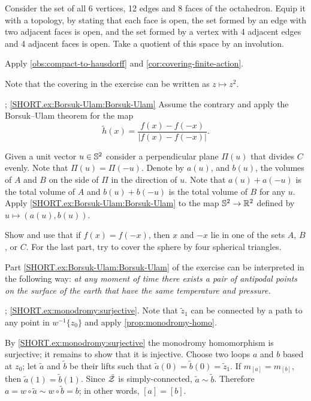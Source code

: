 Consider the set of all 6 vertices, 12 edges and 8 faces of the octahedron.
Equip it with a topology, by stating that each face is open, the set formed by an edge with two adjacent faces is open, and the set formed by a vertex with 4 adjacent edges and 4 adjacent faces is open.
Take a quotient of this space by an involution.


Apply \ref{obs:compact-to-hausdorff} and \ref{cor:covering-finite-action}.

Note that the covering in the exercise can be written as $z\mapsto z^2$.

\parbf{\ref{ex:Borsuk-Ulam}}; \ref{SHORT.ex:Borsuk-Ulam:Borsuk-Ulam}
Assume the contrary and apply the Borsuk--Ulam theorem for the map
\[\tilde h(x)=\frac{f(x)- f(-x)}{|f(x)- f(-x)|}.\]

Given a unit vector $u\in \mathbb{S}^2$ consider a perpendicular plane $\Pi(u)$ that divides $C$ evenly.
Note that $\Pi(u)=\Pi(-u)$.
Denote by $a(u)$, and $b(u)$, the volumes of $A$ and $B$ on the side of $\Pi$ in the direction of $u$.
Note that $a(u)+a(-u)$ is the total volume of $A$ and $b(u)+b(-u)$ is the total volume of $B$ for any $u$.
Apply \ref{SHORT.ex:Borsuk-Ulam:Borsuk-Ulam} to the map $\mathbb{S}^2\to\mathbb{R}^2$ defined by $u\mapsto (a(u),b(u))$.

 Show and use that if $f(x)=f(-x)$, then $x$ and $-x$ lie in one of the sets $A$, $B$, or $C$.
For the last part, try to cover the sphere by four spherical triangles.

Part \ref{SHORT.ex:Borsuk-Ulam:Borsuk-Ulam} of the exercise can be interpreted in the following way:
\textit{at any moment of time there exists a pair of antipodal points on the surface of the earth that have the same temperature and pressure.}

\parbf{\ref{ex:monodromy}}; \ref{SHORT.ex:monodromy:surjective}.
Note that $\tilde z_1$ can be connected by a path to any point in $w^{-1}\{z_0\}$ and apply \ref{prop:monodromy-homo}.

 By \ref{SHORT.ex:monodromy:surjective} the monodromy homomorphism is surjective; it remains to show that it is injective.
Choose two loops $a$ and $b$ based at $z_0$;
let $\tilde a$ and $\tilde b$ be their lifts such that  $\tilde a(0)=\tilde b(0)=\tilde z_1$.
If $m_{[a]}=m_{[b]}$, then $\tilde a(1)=\tilde b(1)$.
Since $\tilde{\mathcal{Z}}$ is simply-connected, $\tilde a\sim \tilde b$.
Therefore $a=w\circ \tilde a\sim w\circ \tilde b =b$; in other words, $[a]=[b]$.

